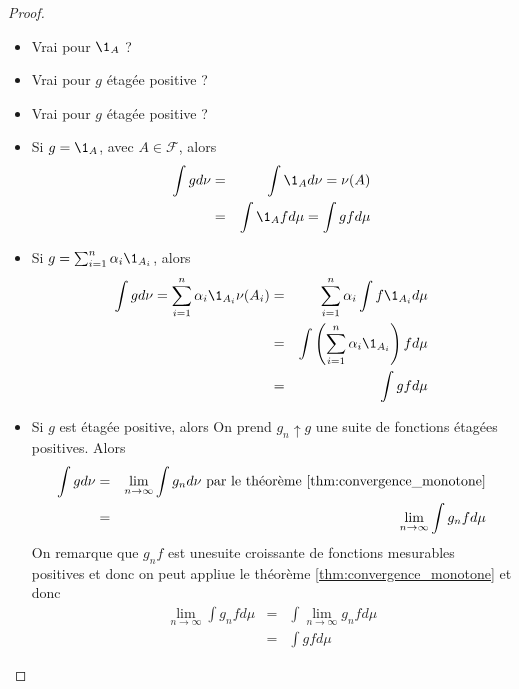 \begin{proof}
	\begin{itemize}
		\item Vrai pour $\1_A$ ?
		\item Vrai pour $g$ étagée positive ?
		\item Vrai pour  $g$ étagée positive ?
	\end{itemize}

	\begin{itemize}
		\item Si $g = \1_A$, avec $A \in \mathscr{F}$, alors
		      \begin{eqnarray*}
			      \int g d \nu &=& \int \1_A d\nu  = \nu(A) \\
			      &=& \int \1_A f d\mu = \int g f d\mu
		      \end{eqnarray*}
		\item Si $g = \sum_{i=1}^n \alpha_i \1_{A_i}$, alors
		      \begin{eqnarray*}
			      \int g d \nu = \sum_{i=1}^n \alpha_i \1_{A_i} \nu(A_i)  &=& \sum_{i=1}^n \alpha_i \int f \1_{A_i} d \mu \\
			      &=&\int \left(\sum_{i=1}^n \alpha_i \1_{A_i}\right) f d \mu \\
			      &=& \int g f d \mu
		      \end{eqnarray*}
		\item Si $g$ est étagée positive, alors
		      On prend $g_n \uparrow g$ une suite de fonctions étagées positives.
		      Alors \begin{eqnarray*}
			      \int g d \nu &=& \lim\limits_{n \to \infty} \int g_n d \nu  \text{ par le théorème \ref{thm:convergence_monotone}}\\
			      &=& \lim\limits_{n \to \infty} \int g_n f d \mu
		      \end{eqnarray*}
		      On remarque que $g_n f$ est unesuite croissante de fonctions mesurables positives et donc
		      on peut appliue le théorème \ref{thm:convergence_monotone} et donc
		      \begin{eqnarray*}
			      \lim\limits_{n \to \infty} \int g_n f d \mu & = & \int  \lim\limits_{n \to \infty} g_n f d \mu \\
			      &=& \int g f d \mu
		      \end{eqnarray*}
	\end{itemize}
\end{proof}

\begin{example} %
\end{example}




